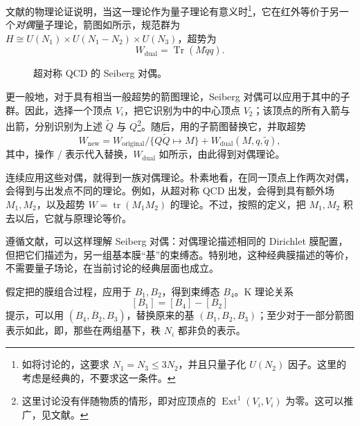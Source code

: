 文献的物理论证说明，当这一理论作为量子理论有意义时\footnote{如将讨论的，这要求 $N_1=N_3\le3N_2$，并且只量子化 $U(N_2)$ 因子。这里的考虑是经典的，不要求这一条件。}，它在红外等价于另一个\emph{对偶}量子理论，箭图如所示，规范群为 $H\cong U(N_1)\times U(N_1-N_2)\times U(N_3)$，超势为
\begin{equation}\label{eq:5.101}
W_{\mathrm{dual}}=\operatorname{Tr}(M\widetilde q q).
\end{equation}
\begin{figure}[H]
\centering
{}
\caption{超对称 QCD 的 Seiberg 对偶。}\label{fig:5.6}
\end{figure}

更一般地，对于具有相当一般超势的箭图理论，Seiberg 对偶可以应用于其中的子群。因此，选择一个顶点 $V_i$，把它识别为中的中心顶点 $V_2$；该顶点的所有入箭与出箭，分别识别为上述 $\widetilde Q$ 与 $Q$\footnote{这里讨论没有伴随物质的情形，即对应顶点的 $\operatorname{Ext}^1(V_i,V_i)$ 为零。这可以推广，见文献。}。随后，用的子箭图替换它，并取超势
\begin{equation}\label{eq:5.102}
W_{\mathrm{new}}=W_{\mathrm{original}}/\{Q\widetilde Q\mapsto M\}
+W_{\mathrm{dual}}(M,q,\widetilde q),
\end{equation}
其中，操作 $/$ 表示代入替换，$W_{\mathrm{dual}}$ 如所示，由此得到对偶理论。

连续应用这些对偶，就得到一族对偶理论。朴素地看，在同一顶点上作两次对偶，会得到与出发点不同的理论。例如，从超对称 QCD 出发，会得到具有额外场 $M_1,M_2$，以及超势 $W=\operatorname{tr}(M_1M_2)$ 的理论。不过，按照的定义，把 $M_1,M_2$ 积去以后，它就与原理论等价。

遵循文献，可以这样理解 Seiberg 对偶：对偶理论描述相同的 Dirichlet 膜配置，但把它们描述为，另一组基本膜“基”的束缚态。特别地，这种经典膜描述的等价，不需要量子场论，在当前讨论的经典层面也成立。

假定把的膜组合过程，应用于 $B_1,B_2$，得到束缚态 $B_4$。K 理论关系
\[
[B_1]=[B_4]-[B_2]
\]
提示，可以用 $(B_4,\overline B_2,B_3)$，替换原来的基 $(B_1,B_2,B_3)$；至少对于一部分箭图表示如此，即，那些在两组基下，秩 $N_i$ 都非负的表示。

